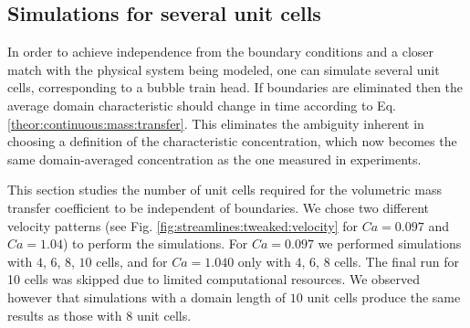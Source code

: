\documentclass{article}
\begin{document}

\subsection{Simulations for several unit cells}
In order to achieve independence from the boundary conditions and a closer match with
the physical system being modeled, one can simulate several unit cells, corresponding
to a bubble train head.  If boundaries are eliminated then the average
domain characteristic should change in time according to Eq.
\ref{theor:continuous:mass:transfer}. This eliminates the ambiguity inherent in choosing a definition
of the characteristic concentration, which now becomes the same domain-averaged concentration
as the one measured in experiments.

This section studies the number of unit cells required for the volumetric
mass transfer coefficient to be independent of boundaries. We chose two
different
velocity patterns (see Fig. \ref{fig:streamlines:tweaked:velocity} for $Ca=0.097$ and $Ca=1.04$) to
perform the simulations. For $Ca=0.097$ we performed simulations with
$4$, $6$, $8$, $10$ cells, and for $Ca=1.040$ only with $4$, $6$, $8$ cells.
The final run for 10 cells was skipped due to limited computational resources.
We observed however that simulations with a domain length of $10$ unit cells produce the same results as those with $8$ unit cells.
\end{document}
